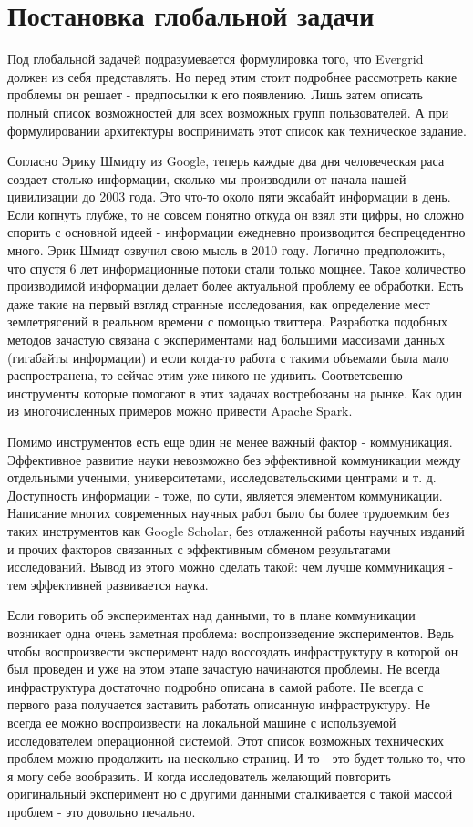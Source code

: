 \chapter{Постановка глобальной задачи}

Под глобальной задачей подразумевается формулировка того, что Evergrid должен из себя представлять. Но перед этим стоит подробнее рассмотреть какие проблемы он решает - предпосылки к его появлению. Лишь затем описать полный список возможностей для всех возможных групп пользователей. А при формулировании архитектуры воспринимать этот список как техническое задание.

Согласно Эрику Шмидту из Google, теперь каждые два дня человеческая раса создает столько информации, сколько мы производили от начала нашей цивилизации до 2003 года. Это что-то около пяти эксабайт информации в день. Если копнуть глубже, то не совсем понятно откуда он взял эти цифры\cite{five_exabytes_per_2_days}, но сложно спорить с основной идеей - информации ежедневно производится беспрецедентно много. Эрик Шмидт озвучил свою мысль в 2010 году. Логично предположить, что спустя 6 лет информационные потоки стали только мощнее. Такое количество производимой информации делает более актуальной проблему ее обработки. Есть даже такие на первый взгляд странные исследования, как определение мест землетрясений в реальном времени с помощью твиттера\cite{Sakaki:2010:EST:1772690.1772777}. Разработка подобных методов зачастую связана с экспериментами над большими массивами данных (гигабайты информации) и если когда-то работа с такими объемами была мало распространена, то сейчас этим уже никого не удивить. Соответсвенно инструменты которые помогают в этих задачах востребованы на рынке. Как один из многочисленных примеров можно привести Apache Spark.

Помимо инструментов есть еще один не менее важный фактор - коммуникация. Эффективное развитие науки невозможно без эффективной коммуникации между отдельными учеными, университетами, исследовательскими центрами и т. д. Доступность информации - тоже, по сути, является элементом коммуникации. Написание многих современных научных работ было бы более трудоемким без таких инструментов как Google Scholar, без отлаженной работы научных изданий и прочих факторов связанных с эффективным обменом результатами исследований. Вывод из этого можно сделать такой: чем лучше коммуникация - тем эффективней развивается наука.

Если говорить об экспериментах над данными, то в плане коммуникации возникает одна очень заметная проблема: воспроизведение экспериментов. Ведь чтобы воспроизвести эксперимент надо воссоздать инфраструктуру в которой он был проведен и уже на этом этапе зачастую начинаются проблемы. Не всегда инфраструктура достаточно подробно описана в самой работе. Не всегда с первого раза получается заставить работать описанную инфраструктуру. Не всегда ее можно воспроизвести на локальной машине с используемой исследователем операционной системой. Этот список возможных технических проблем можно продолжить на несколько страниц. И то - это будет только то, что я могу себе вообразить. И когда исследователь желающий повторить оригинальный эксперимент но с другими данными сталкивается с такой массой проблем - это довольно печально.  

